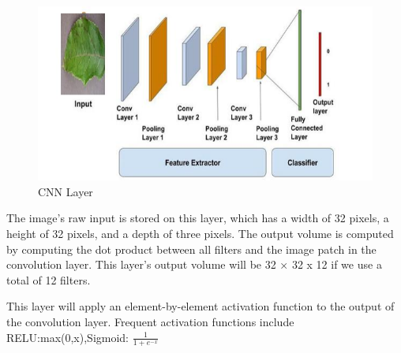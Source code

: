 \begin{figure}[]
\includegraphics{Capture}
\caption{CNN Layer}
\end{figure}

The image's raw input is stored on this layer, which has a width of 32 pixels, a height of 32 pixels, and a depth of three pixels.
The output volume is computed by computing the dot product between all filters and the image patch in the convolution layer. This layer's output volume will be 32 × 32 x 12 if we use a total of 12 filters.

This layer will apply an element-by-element activation function to the output of the convolution layer. Frequent activation functions include RELU:max(0,x),Sigmoid: $\frac{1}{1+e^{-x}}$
